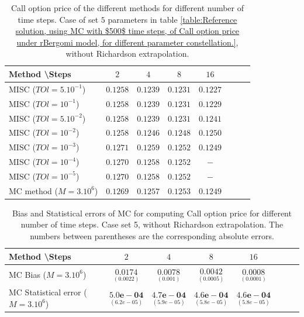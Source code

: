 \documentclass[11pt]{article}
\begin{document}
\begin{table}[h!]
	\centering
	\begin{tabular}{l*{6}{c}r}
		Method \textbackslash  Steps            & $2$ & $4$ & $8$ & $16$ &   \\
		\hline
		MISC ($TOl=5.10^{-1}$)  & $0.1258$ & $0.1239$ & $0.1231$ & $0.1227$  \\
		MISC ($TOl=10^{-1}$)  & $0.1258$ & $0.1239$ & $0.1231$ & $0.1229$  \\
		MISC ($TOl=5.10^{-2}$)  & $0.1258$ & $0.1239$ & $0.1231$ & $0.1241$  \\
		MISC ($TOl=10^{-2}$)  & $0.1258$ & $0.1246$ & $0.1248$ & $0.1250$  \\
		
		MISC ($TOl=10^{-3}$)  & $0.1271$ & $0.1259$ & $0.1252$ & $0.1249$  \\
		MISC ($TOl=10^{-4}$)  & $0.1270$ & $0.1258$ & $0.1252$ & $-$  \\
		
			MISC ($TOl=10^{-5}$)  & $0.1270$ &$0.1258$ &  $0.1252$ & $-$  \\
		\hline
		MC method ($M=3.10^{6}$)   & $    0.1269$ & $0.1257$  & $0.1253$ & $0.1249$ \\		
		
		\hline
	\end{tabular}
	\caption{ Call option price of the different methods for different number of time steps. Case of set $5$ parameters in table \ref{table:Reference solution, using MC with $500$ time steps, of Call option price under rBergomi model, for different parameter constellation.}, without Richardson extrapolation.}
	\label{table: Call option price of the different methods for different number of time steps. Case set 5}
\end{table}


\begin{table}[h!]
	\centering
	\begin{tabular}{l*{6}{c}r}
		Method \textbackslash  Steps            & $2$ & $4$ & $8$ & $16$  \\
		\hline
		MC Bias ($M=3.10^6$)   & 	$ \underset{(    0.0022)}{\mathbf{0.0174}}$  & $\underset{(0.001)}{\mathbf{0.0078}}$  & $\underset{(0.0005)}{\mathbf{0.0042}}$ & $\underset{(0.0001)}{\mathbf{0.0008}}$\\ 
		
		MC Statistical error ($M=3.10^6$)  &  $\underset{(   6.2e-05)} {\mathbf{5.0e-04}}$  & $\underset{(5.9e-05)} {\mathbf{4.7e-04}}$  & $\underset{(5.8e-05)} {\mathbf{4.6e-04 }}$ & $\underset{(5.8e-05)} {\mathbf{4.6e-04 }}$	\\
		
		\hline
	\end{tabular}
	\caption{Bias and Statistical errors of MC   for computing Call option price  for different number of time steps. Case set 5, without Richardson extrapolation. The numbers between parentheses are the corresponding absolute errors.}
	\label{Bias and Statistical errors of MC ($M=10^6$)  for computing Call option price  for different number of time steps. Case set 5, without Richardson extrapolation. The numbers between parentheses are the corresponding absolute errors.}
\end{table}
\end{document}
